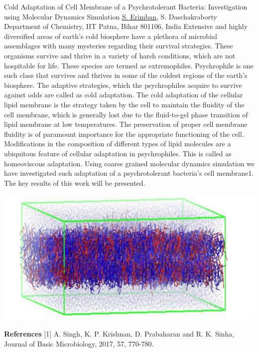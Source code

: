 
    \begin{abstract_online}{Cold Adaptation of Cell Membrane of a Psychrotolerant Bacteria: Investigation using Molecular Dynamics Simulation}{%
        \underline{S. Erimban}, S. Daschakraborty}{%
        }{%
        Department of Chemistry, IIT Patna, Bihar 801106, India}
    Extensive and highly diversified areas of earth’s cold biosphere have a plethora of microbial assemblages with many mysteries regarding their survival strategies. These organisms survive and thrive in a variety of harsh conditions, which are not hospitable for life. These species are termed as extremophiles. Psychrophile is one such class that survives and thrives in some of the coldest regions of the earth’s biosphere. The adaptive strategies, which the psychrophiles acquire to survive against odds are called as cold adaptation. The cold adaptation of the cellular lipid membrane is the strategy taken by the cell to maintain the fluidity of the cell membrane, which is generally lost due to the fluid-to-gel phase transition of lipid membrane at low temperatures. The preservation of proper cell membrane fluidity is of paramount importance for the appropriate functioning of the cell. Modifications in the composition of different types of lipid molecules are a ubiquitous feature of cellular adaptation in psychrophiles. This is called as homeoviscous adaptation. Using coarse grained molecular dynamics simulation we have investigated such adaptation of a psychrotolerant bacteria’s cell membrane1. The key results of this work will be presented. \begin{center}  \includegraphics[width=0.9\linewidth]{abstracts/txt/figures/shakkira.png}  \caption{Snapshot of our simulated system modeled with the MARTINI Force field.}  \end{center}  
    
        \textbf{References} \newline{}[1] A. Singh, K. P. Krishnan, D. Prabaharan and R. K. Sinha, Journal of Basic Microbiology, 2017, 57, 770-780.
    \end{abstract_online}
    